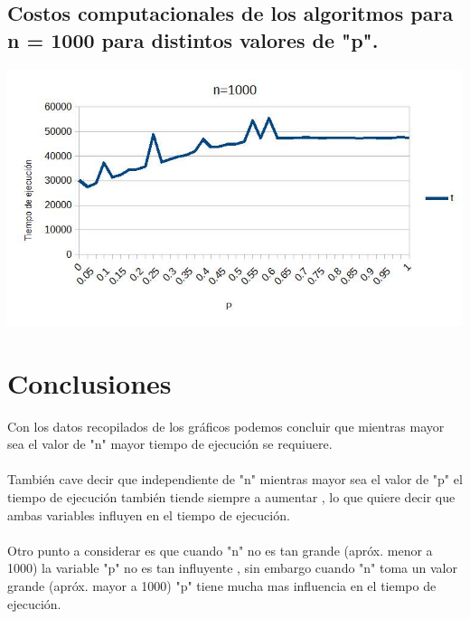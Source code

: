 \documentclass[12pt,letterpaper]{scrartcl}
\begin{document}
\subsection{Costos computacionales de los algoritmos para n = 1000 para distintos valores de "p".}

\includegraphics[scale=0.55]{nnn}

\newpage
\section{Conclusiones}

Con los datos recopilados de los gráficos podemos concluir que mientras mayor sea el valor de "n" mayor tiempo de ejecución se requiuere.
\\\\
También cave decir que independiente de "n" mientras mayor sea el valor de "p" el tiempo de ejecución también tiende siempre a aumentar , lo que quiere decir que ambas variables influyen en el tiempo de ejecución.
\\\\
Otro punto a considerar es que cuando "n" no es tan grande (apróx. menor a 1000) la variable "p" no es tan influyente , sin embargo cuando "n" toma un valor grande (apróx. mayor a 1000) "p" tiene mucha mas influencia en el tiempo de ejecución.
\end{document}
